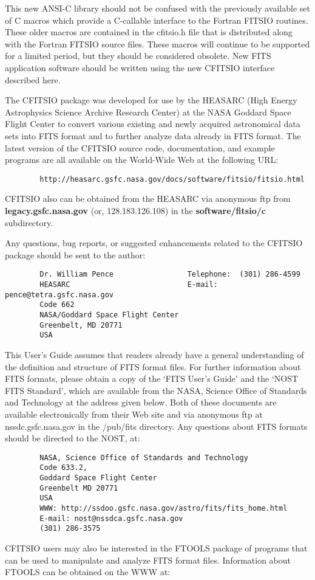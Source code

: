 This new ANSI-C library should not be confused with the previously
available set of C macros which provide a C-callable interface to the
Fortran FITSIO routines.  These older macros are contained in the
cfitsio.h file that is distributed along with the Fortran FITSIO source
files.  These macros will continue to be supported for a limited
period, but they should be considered obsolete.  New FITS application
software should be written using the new CFITSIO interface described
here.

The CFITSIO package was developed for use by the HEASARC (High Energy
Astrophysics Science Archive Research Center) at the NASA Goddard Space
Flight Center to convert various existing and newly acquired
astronomical data sets into FITS format and to further analyze data
already in FITS format.  The latest version of the CFITSIO source code,
documentation, and example programs are all available on the World-Wide
Web at the following URL:

\begin{verbatim}
        http://heasarc.gsfc.nasa.gov/docs/software/fitsio/fitsio.html
\end{verbatim}
CFITSIO also can be obtained from the HEASARC via anonymous ftp from
{\bf legacy.gsfc.nasa.gov}    (or, 128.183.126.108) in the
{\bf software/fitsio/c} subdirectory.

Any questions, bug reports, or suggested enhancements related to the CFITSIO
package should be sent to the author:

\begin{verbatim}
        Dr. William Pence                 Telephone:  (301) 286-4599
        HEASARC                           E-mail: pence@tetra.gsfc.nasa.gov
        Code 662
        NASA/Goddard Space Flight Center
        Greenbelt, MD 20771
        USA
\end{verbatim}
This User's Guide assumes that readers already have a general
understanding of the definition and structure of FITS format files.
For further information about FITS formats, please obtain a copy of the
`FITS User's Guide' and the `NOST FITS Standard', which are available
from the NASA, Science Office of Standards and Technology at the
address given below.  Both of these documents are available
electronically from their Web site and via anonymous ftp at
nssdc.gsfc.nasa.gov in the /pub/fits directory. Any questions about
FITS formats should be directed to the NOST, at:

\begin{verbatim}
        NASA, Science Office of Standards and Technology
        Code 633.2,
        Goddard Space Flight Center
        Greenbelt MD 20771
        USA
        WWW: http://ssdoo.gsfc.nasa.gov/astro/fits/fits_home.html
        E-mail: nost@nssdca.gsfc.nasa.gov
        (301) 286-3575
\end{verbatim}
CFITSIO users may also be interested in the FTOOLS package of programs
that can be used to manipulate and analyze FITS format files.
Information about FTOOLS can be obtained on the WWW at:

